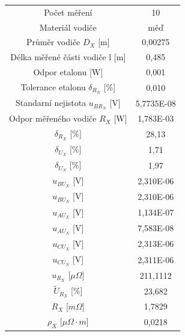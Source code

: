 \documentclass[a4paper, czech]{article}
\begin{document}
\begin{table}[H]
    \begin{tabular}{cc}
        \hline
        \cellcolor{lightgray}    Počet měření                     & \cellcolor{yellow} 10         \\
        \cellcolor{lightgray} Materiál vodiče                       & \cellcolor{yellow} měď    \\
        \cellcolor{lightgray} Průměr vodiče $D_X$ {[}m{]}              & \cellcolor{yellow} 0,00275     \\
        \cellcolor{lightgray} Délka měřené části vodiče l {[}m{]}   & \cellcolor{yellow} 0,485      \\
        \cellcolor{lightgray} Odpor etalonu {[}W{]}                 & \cellcolor{yellow} 0,001      \\
        \cellcolor{lightgray} Tolerance etalonu $\delta_{R_N}$ {[}\%{]}        & \cellcolor{yellow} 0,010      \\
        Standarní nejistota $u_{BR_N}$ {[}V{]}      & 5,7735E-08 \\
        Odpor měřeného vodiče $R_X$ {[}W{]}      & 1,783E-03  \\
        $\delta_{R_X}$ {[}\%{]}                          & 28,13      \\
        $\delta_{U_X}$ {[}\%{]}                          & 1,71       \\
        $\delta_{U_N}$ {[}\%{]}                          & 1,97       \\
        $u_{BU_X}$ {[}V{]}                          & 2,310E-06  \\
        $u_{BU_N}$ {[}V{]}                          & 2,310E-06  \\
        $u_{AU_X}$ {[}V{]}                          & 1,134E-07  \\
        $u_{AU_N}$ {[}V{]}                          & 7,583E-08  \\
        $u_{CU_X}$ {[}V{]}                          & 2,313E-06  \\
        $u_{CU_N}$ {[}V{]}                          & 2,311E-06  \\
        \cellcolor{lightgray} $u_{R_X}$ [$\mu \Omega$]                          & \cellcolor{yellow} 211,1112   \\
        \cellcolor{lightgray} $\tilde{U}_{R_X}$ [\%]                     & \cellcolor{yellow} 23,682     \\
        \cellcolor{lightgray} $R_X$ [$m \Omega$]                  & \cellcolor{yellow} 1,7829     \\
        \cellcolor{lightgray} $\rho_X$ [$\mu \Omega \cdot m$]                       & \cellcolor{yellow} 0,0218      \\
        \hline
    \end{tabular}
\end{table}
\end{document}
